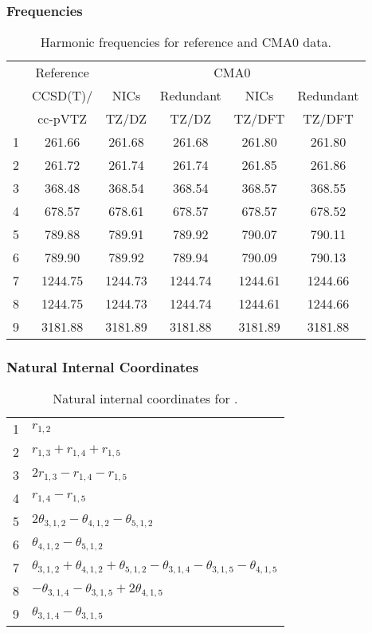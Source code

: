 \documentclass[10pt,oneside]{article}
\begin{document}
\begin{table}[h!]
\subsubsection*{Frequencies}
\centering
\caption{Harmonic frequencies for reference and CMA0 data.}
\begin{tabular}{cccccc}
\toprule
{} & Reference & \multicolumn{4}{c}{CMA0} \\
{} &  CCSD(T)/ &    NICs &  Redundant &    NICs & Redundant \\
{} &   cc-pVTZ &   TZ/DZ &      TZ/DZ &  TZ/DFT &    TZ/DFT \\
\midrule
1 &    261.66 &  261.68 &     261.68 &  261.80 &    261.80 \\
2 &    261.72 &  261.74 &     261.74 &  261.85 &    261.86 \\
3 &    368.48 &  368.54 &     368.54 &  368.57 &    368.55 \\
4 &    678.57 &  678.61 &     678.57 &  678.57 &    678.52 \\
5 &    789.88 &  789.91 &     789.92 &  790.07 &    790.11 \\
6 &    789.90 &  789.92 &     789.94 &  790.09 &    790.13 \\
7 &   1244.75 & 1244.73 &    1244.74 & 1244.61 &   1244.66 \\
8 &   1244.75 & 1244.73 &    1244.74 & 1244.61 &   1244.66 \\
9 &   3181.88 & 3181.89 &    3181.88 & 3181.89 &   3181.88 \\
\bottomrule
\end{tabular}
\end{table}

\begin{table}[h!]
\subsubsection*{Natural Internal Coordinates}
\centering
\caption{Natural internal coordinates for .}
\small
\begin{tabular}{ll}
\toprule
  1   & $r_{1,2}$ \\
  2   & $r_{1,3} + r_{1,4} + r_{1,5}$ \\
  3   & $2r_{1,3} - r_{1,4} - r_{1,5}$ \\
  4   & $r_{1,4} - r_{1,5}$ \\
  5   & $2\theta_{3,1,2} - \theta_{4,1,2} - \theta_{5,1,2}$ \\
  6   & $\theta_{4,1,2} - \theta_{5,1,2}$ \\
  7   & $\theta_{3,1,2} + \theta_{4,1,2} + \theta_{5,1,2} - \theta_{3,1,4} - \theta_{3,1,5} - \theta_{4,1,5}$ \\
  8   & $-\theta_{3,1,4} - \theta_{3,1,5} + 2\theta_{4,1,5}$ \\
  9   & $\theta_{3,1,4} - \theta_{3,1,5}$ \\
\bottomrule
\end{tabular}
\end{table}
\end{document}
